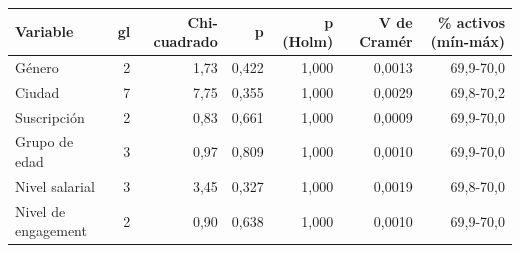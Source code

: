 \begin{tabular}{lrrrrrr}
\toprule
Variable & gl & Chi-cuadrado & p & p (Holm) & V de Cramér & \% activos (mín-máx) \\
\midrule
Género & 2 & 1,73 & 0,422 & 1,000 & 0,0013 & 69,9-70,0 \\
Ciudad & 7 & 7,75 & 0,355 & 1,000 & 0,0029 & 69,8-70,2 \\
Suscripción & 2 & 0,83 & 0,661 & 1,000 & 0,0009 & 69,9-70,0 \\
Grupo de edad & 3 & 0,97 & 0,809 & 1,000 & 0,0010 & 69,9-70,0 \\
Nivel salarial & 3 & 3,45 & 0,327 & 1,000 & 0,0019 & 69,8-70,0 \\
Nivel de engagement & 2 & 0,90 & 0,638 & 1,000 & 0,0010 & 69,9-70,0 \\
\bottomrule
\end{tabular}
